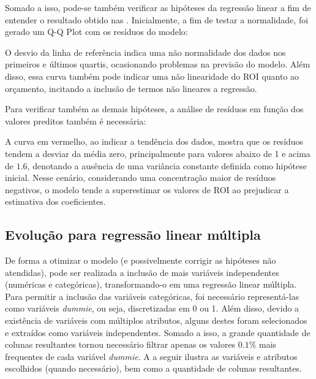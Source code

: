 Somado a isso, pode-se também verificar as hipóteses da regressão linear a fim de entender o resultado obtido nas . Inicialmente, a fim de testar a normalidade, foi gerado um Q-Q Plot com os resíduos do modelo:

%

O desvio da linha de referência indica uma não normalidade dos dados nos primeiros e últimos quartis, ocasionando problemas na previsão do modelo. Além disso, essa curva também pode indicar uma não linearidade do \acrshort{ROI} quanto ao orçamento, incitando a inclusão de termos não lineares a regressão.

Para verificar também as demais hipóteses, a análise de resíduos em função dos valores preditos também é necessária:

%

A curva em vermelho, ao indicar a tendência dos dados, mostra que os resíduos tendem a desviar da média zero, principalmente para valores abaixo de 1 e acima de $1.6$, denotando a ausência de uma variância constante definida como hipótese inicial. Nesse cenário, considerando uma concentração maior de resíduos negativos, o modelo tende a superestimar os valores de \acrshort{ROI} ao prejudicar a estimativa dos coeficientes.

\subsection{Evolução para regressão linear múltipla}\label{multiple-linear-regression}
De forma a otimizar o modelo (e possivelmente corrigir as hipóteses não atendidas), pode ser realizada a inclusão de mais variáveis independentes (numéricas e categóricas), transformando-o em uma regressão linear múltipla. Para permitir a inclusão das variáveis categóricas, foi necessário representá-las como variáveis \textit{dummie}, ou seja, discretizadas em 0 ou 1. Além disso, devido a existência de variáveis com múltiplos atributos, alguns destes foram selecionados e extraídos como variáveis independentes. Somado a isso, a grande quantidade de colunas resultantes tornou necessário filtrar apenas os valores $0.1\%$ mais frequentes de cada variável \textit{dummie}. A  a seguir ilustra as variáveis e atributos escolhidos (quando necessário), bem como a quantidade de colunas resultantes.

